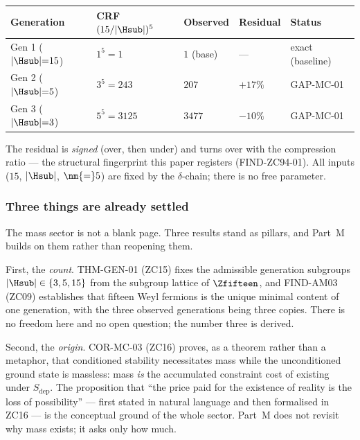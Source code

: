 \documentclass[12pt, a4paper]{article}
\begin{document}
\begin{keybox}[title={Numerical Summary --- the live mass-sector frontier}]
{\footnotesize\renewcommand{\arraystretch}{1.3}
\begin{center}
\begin{tabular}{@{}p{3.0cm}p{2.4cm}p{2.2cm}p{2.0cm}p{2.4cm}@{}}
\toprule
\textbf{Generation} & \textbf{CRF $(15/|\Hsub|)^5$} & \textbf{Observed} &
\textbf{Residual} & \textbf{Status} \\
\midrule
Gen 1 ($|\Hsub|{=}15$) & $1^5 = 1$    & $1$ (base) & ---    & exact (baseline) \\
Gen 2 ($|\Hsub|{=}5$)  & $3^5 = 243$  & $207$      & $+17\%$ & GAP-MC-01 \\
Gen 3 ($|\Hsub|{=}3$)  & $5^5 = 3125$ & $3477$     & $-10\%$ & GAP-MC-01 \\
\bottomrule
\end{tabular}
\end{center}}
\smallskip
\footnotesize The residual is \emph{signed} (over, then under) and turns over
with the compression ratio --- the structural fingerprint this paper registers
(FIND-ZC94-01). All inputs ($15$, $|\Hsub|$, $\nm{=}5$) are fixed by the
$\delta$-chain; there is no free parameter.
\end{keybox}

\subsubsection{Three things are already settled}

The mass sector is not a blank page. Three results stand as pillars, and Part~M
builds on them rather than reopening them.

First, the \emph{count}. THM-GEN-01 (ZC15) fixes the admissible generation
subgroups $|\Hsub|\in\{3,5,15\}$ from the subgroup lattice of $\Zfifteen$, and
FIND-AM03 (ZC09) establishes that fifteen Weyl fermions is the unique minimal
content of one generation, with the three observed generations being three
copies. There is no freedom here and no open question; the number three is
derived.

Second, the \emph{origin}. COR-MC-03 (ZC16) proves, as a theorem rather than a
metaphor, that conditioned stability necessitates mass while the unconditioned
ground state is massless: mass \emph{is} the accumulated constraint cost of
existing under $S_{\mathrm{dep}}$. The proposition that ``the price paid for
the existence of reality is the loss of possibility'' --- first stated in
natural language and then formalised in ZC16 --- is the conceptual ground of
the whole sector. Part~M does not revisit why mass exists; it asks only how
much.
\end{document}
